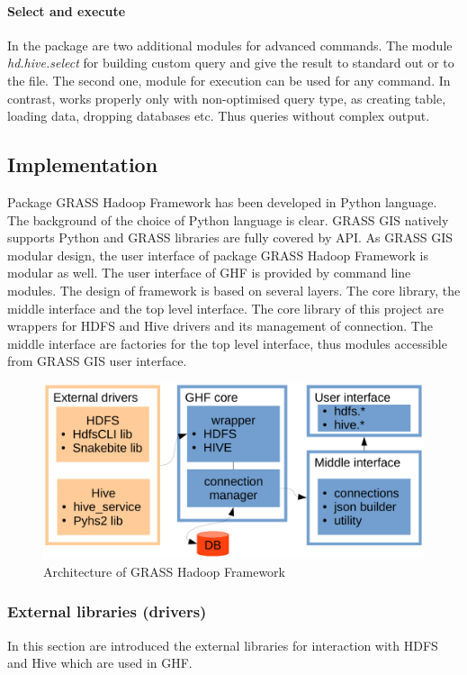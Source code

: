 \documentclass[a4paper,12pt,oneside]{report}
\begin{document}
    \paragraph{Select and execute} In the package are two additional modules for
    advanced commands. The module \textit{hd.hive.select} for building custom query
    and give the result to standard out or to the file. The second one, module for
    execution can be used for any command. In contrast, works properly only with
    non-optimised query type, as creating table, loading data, dropping databases
    etc. Thus queries without complex output.
	
	

	
	\subsection{Implementation}
	Package GRASS Hadoop Framework has been developed in Python language. The
	background of the choice of Python language is clear. GRASS GIS natively
	supports Python and GRASS libraries are fully covered by API. As GRASS GIS modular design, the
	user interface of package GRASS Hadoop Framework is modular as well. The user
	interface of GHF is provided by command line modules. 
	The design of framework is based on several layers. The core library, the middle
	interface and the top level interface. The core library of this project are
	wrappers for HDFS and Hive drivers and its management of connection. The middle
	interface are factories for the top level interface, thus modules accessible
	from GRASS GIS user interface.
	
	\begin{figure}[!htbp]
		\centering
		\includegraphics[width=1\textwidth]{./img/implementation.pdf}
		\caption[Architecture of GHF]{\centering Architecture of GRASS Hadoop
			Framework}
	\end{figure} 
	
	
	\subsubsection{External libraries (drivers)}
	In this section are introduced the external libraries for interaction with HDFS
	and Hive which are used in GHF. 
	
\end{document}
